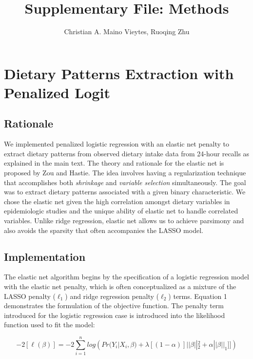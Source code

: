 \documentclass{article}
\title{Supplementary File: Methods}
\author{Christian A. Maino Vieytes, Ruoqing Zhu}
\date{}
\begin{document}
\maketitle
{}

\tableofcontents


\section{Dietary Patterns Extraction with Penalized Logit}
\subsection{Rationale}
\hspace{\parindent} We implemented penalized logistic regression with an elastic net penalty to extract dietary patterns from observed dietary intake data from 24-hour recalls as explained in the main text. The theory and rationale for the elastic net is proposed by Zou and Hastie. \supercite{zou2005regularization} The idea involves having a regularization technique that accomplishes both \textit{shrinkage} and \textit{variable selection} simultaneously. The goal was to extract dietary patterns associated with a given binary characteristic. We chose the elastic net given the high correlation amongst dietary variables in epidemiologic studies and the unique ability of elastic net to handle correlated variables. Unlike ridge regression, elastic net allows us to achieve parsimony and also avoids the sparsity that often accompanies the LASSO model.\supercite{zou2005regularization}

\subsection{Implementation}
 \hspace{\parindent}The elastic net algorithm begins by the specification of a logistic regression model with the elastic net penalty, which is often conceptualized as a mixture of the LASSO penalty ($\ell_1$) and ridge regression penalty ($\ell_2$)  terms. Equation 1 demonstrates the formulation of the objective function. The penalty term introduced for the logistic regression case is introduced into the likelihood function used to fit the model:

\begin{equation}
	-2[\ell(\beta)]=-2\sum_{i=1}^nlog({Pr(Y_i|X_i,\beta)+\lambda[(1-\alpha)]||\beta||_2^2+\alpha||\beta||_1]]}) \tag{1}
\end{equation}
\end{document}
